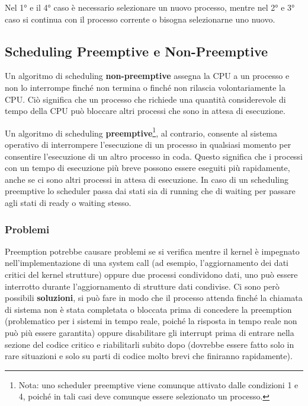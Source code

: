 \documentclass{article}
\begin{document}
Nel 1° e il 4° caso è necessario selezionare un nuovo processo, mentre nel 2° e 3° caso si continua con il processo corrente o bisogna selezionarne uno nuovo. 
\subsection{Scheduling Preemptive e Non-Preemptive}
Un algoritmo di scheduling \textbf{non-preemptive} assegna la CPU a un processo e non lo interrompe finché non termina o finché non rilascia volontariamente la CPU. Ciò significa che un processo che richiede una quantità considerevole di tempo della CPU può bloccare altri processi che sono in attesa di esecuzione.\par
Un algoritmo di scheduling \textbf{preemptive}\footnote{Nota: uno scheduler preemptive viene comunque attivato dalle condizioni 1 e 4, poiché in tali casi deve comunque essere selezionato un processo.}, al contrario, consente al sistema operativo di interrompere l'esecuzione di un processo in qualsiasi momento per consentire l'esecuzione di un altro processo in coda. Questo significa che i processi con un tempo di esecuzione più breve possono essere eseguiti più rapidamente, anche se ci sono altri processi in attesa di esecuzione. In caso di un scheduling preemptive lo scheduler passa dai stati sia di running che di waiting per passare agli stati di ready o waiting stesso.  
\subsubsection{Problemi}
Preemption potrebbe causare problemi se si verifica mentre il kernel è impegnato nell'implementazione di una system call (ad esempio, l'aggiornamento dei dati critici del kernel strutture) oppure due processi condividono dati, uno può essere interrotto durante l'aggiornamento di strutture dati condivise. Ci sono però possibili \textbf{soluzioni}, si può fare in modo che il processo attenda finché la chiamata di sistema non è stata completata o bloccata prima di concedere la preemption (problematico per i sistemi in tempo reale, poiché la risposta in tempo reale non può più essere garantita) oppure disabilitare gli interrupt prima di entrare nella sezione del codice critico e riabilitarli subito dopo (dovrebbe essere fatto solo in rare situazioni e solo su parti di codice molto brevi che finiranno rapidamente). \\
\end{document}
